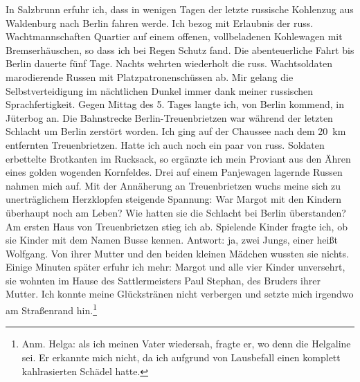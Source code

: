 \documentclass[a5paper,pagesize,10pt,twoside=true]{scrbook}
\renewcommand{\marginpar}[2][]{}
\begin{document}
In Salzbrunn erfuhr ich, dass in wenigen Tagen der letzte russische Kohlenzug aus Waldenburg nach Berlin fahren werde. Ich bezog mit Erlaubnis der russ. Wachtmannschaften Quartier auf einem offenen, vollbeladenen Kohlewagen mit Bremserhäuschen, so dass ich bei Regen Schutz fand. Die abenteuerliche Fahrt bis Berlin dauerte fünf Tage. Nachts wehrten wiederholt die russ. Wachtsoldaten marodierende Russen mit Platzpatronenschüssen ab. Mir gelang die Selbstverteidigung im nächtlichen Dunkel immer dank meiner russischen Sprachfertigkeit. Gegen Mittag des 5. Tages langte ich, von Berlin \marginpar{103} kommend, in Jüterbog an. Die Bahnstrecke Berlin-Treuenbrietzen war während der letzten Schlacht um Berlin zerstört worden. Ich ging auf der Chaussee nach dem 20~km entfernten Treuenbrietzen. Hatte ich auch noch ein paar von russ. Soldaten erbettelte Brotkanten im Rucksack, so ergänzte ich mein Proviant aus den Ähren eines golden wogenden Kornfeldes. Drei auf einem Panjewagen lagernde Russen nahmen mich auf. Mit der Annäherung an Treuenbrietzen wuchs meine sich zu unerträglichem Herzklopfen steigende Spannung: War Margot mit den Kindern überhaupt noch am Leben? Wie hatten sie die Schlacht bei Berlin überstanden? Am ersten Haus von Treuenbrietzen stieg ich ab. Spielende Kinder fragte ich, ob sie Kinder mit dem Namen Busse kennen. Antwort: ja, zwei Jungs, einer heißt Wolfgang. Von ihrer Mutter und den beiden kleinen Mädchen wussten sie nichts. Einige Minuten später erfuhr ich mehr: Margot und alle vier Kinder unversehrt, sie wohnten im Hause des Sattlermeisters Paul Stephan, des Bruders ihrer Mutter. Ich konnte meine Glückstränen nicht verbergen und setzte mich irgendwo am Straßenrand hin.\footnote{Anm. Helga: als ich meinen Vater wiedersah, fragte er, wo denn die Helgaline sei. Er erkannte mich nicht, da ich aufgrund von Lausbefall einen komplett kahlrasierten Schädel hatte.}
\end{document}
